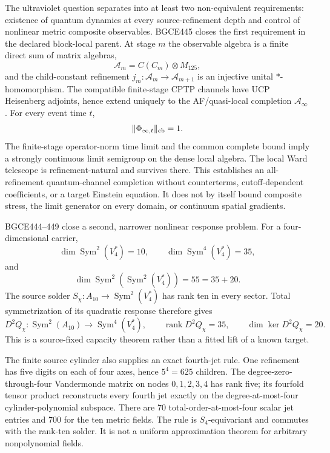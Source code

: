 \documentclass[11pt]{article}
\theoremstyle{definition}
\theoremstyle{remark}
\newcommand{\Sym}{\operatorname{Sym}}
\begin{document}
The ultraviolet question separates into at least two non-equivalent requirements: existence of quantum dynamics at every source-refinement depth and control of nonlinear metric composite observables. BGCE445 closes the first requirement in the declared block-local parent. At stage $m$ the observable algebra is a finite direct sum of matrix algebras,
\begin{equation}
 \mathcal A_m=C(C_m)\otimes M_{125},
\end{equation}
and the child-constant refinement $j_m:\mathcal A_m\to\mathcal A_{m+1}$ is an injective unital $*$-homomorphism. The compatible finite-stage CPTP channels have UCP Heisenberg adjoints, hence extend uniquely to the AF/quasi-local completion $\mathcal A_\infty$. For every event time $t$,
\begin{equation}
 \lVert\Phi_{\infty,t}\rVert_{\rm cb}=1.
\end{equation}
The finite-stage operator-norm time limit and the common complete bound imply a strongly continuous limit semigroup on the dense local algebra. The local Ward telescope is refinement-natural and survives there. This establishes an all-refinement quantum-channel completion without counterterms, cutoff-dependent coefficients, or a target Einstein equation. It does not by itself bound composite stress, the limit generator on every domain, or continuum spatial gradients.

BGCE444--449 close a second, narrower nonlinear response problem. For a four-dimensional carrier,
\begin{equation}
 \dim\Sym^2(V_4^*)=10,
 \qquad
 \dim\Sym^4(V_4^*)=35,
\end{equation}
and
\begin{equation}
 \dim\Sym^2\!\left(\Sym^2(V_4^*)\right)=55=35+20.
\end{equation}
The source solder $S_\chi:A_{10}\to\Sym^2(V_4^*)$ has rank ten in every sector. Total symmetrization of its quadratic response therefore gives
\begin{equation}
 D^2Q_\chi:\Sym^2(A_{10})\longrightarrow\Sym^4(V_4^*),
 \qquad \operatorname{rank}D^2Q_\chi=35,
 \qquad \dim\ker D^2Q_\chi=20.
\end{equation}
This is a source-fixed capacity theorem rather than a fitted lift of a known target.

The finite source cylinder also supplies an exact fourth-jet rule. One refinement has five digits on each of four axes, hence $5^4=625$ children. The degree-zero-through-four Vandermonde matrix on nodes $0,1,2,3,4$ has rank five; its fourfold tensor product reconstructs every fourth jet exactly on the degree-at-most-four cylinder-polynomial subspace. There are 70 total-order-at-most-four scalar jet entries and 700 for the ten metric fields. The rule is $S_4$-equivariant and commutes with the rank-ten solder. It is not a uniform approximation theorem for arbitrary nonpolynomial fields.
\end{document}
